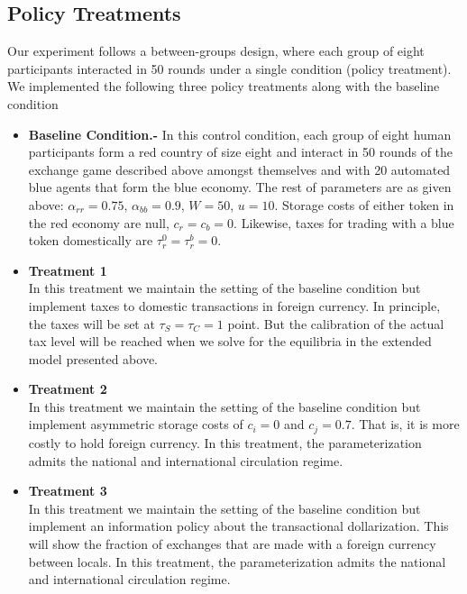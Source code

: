 \subsection{Policy Treatments}
Our experiment follows a between-groups design, where each group of eight participants interacted in 50 rounds under a single condition (policy treatment). We implemented the following three policy treatments along with the baseline condition   
\begin{itemize}
\item[] \textbf{Baseline Condition.-} In this control condition, each group of eight human participants form a red country of size eight and interact in 50 rounds of the exchange game described above amongst themselves and with 20 automated blue agents that form the blue economy. The rest of parameters are as given above: $\alpha_{rr}=0.75$, $\alpha_{bb}=0.9$, $W=50$, $u=10$. Storage costs of either token in the red economy are null, $c_r = c_b = 0$. Likewise, taxes for trading with a blue token domestically are $\tau_{r}^{0} = \tau_{r}^{b} = 0$.

\item[] \textbf{Treatment 1} \\
In this treatment we maintain the setting of the baseline condition but implement taxes to domestic transactions in foreign currency. In principle, the taxes will be set at $\tau_{S} = \tau_{C} = 1$ point. But the calibration of the actual tax level will be reached when we solve for the equilibria in the extended model presented above. 
    
\item[] \textbf{Treatment 2} \\
In this treatment we maintain the setting of the baseline condition but implement asymmetric storage costs of $c_i = 0$ and $c_j = 0.7$. That is, it is more costly to hold foreign currency. In this treatment, the parameterization admits the national and international circulation regime.

\item[] \textbf{Treatment 3} \\
In this treatment we maintain the setting of the baseline condition but implement an information policy about the transactional dollarization. This will show the fraction of exchanges that are made with a foreign currency between locals. In this treatment, the parameterization admits the national and international circulation regime.
\end{itemize}

